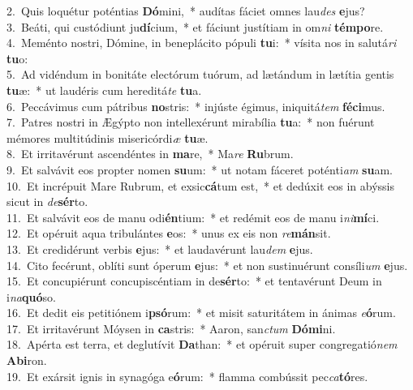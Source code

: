 {2.~}Quis loquétur poténtias \textbf{Dó}mini,~* audítas fáciet omnes lau\textit{des} \textbf{e}jus?\\
{3.~}Beáti, qui custódiunt ju\textbf{dí}cium,~* et fáciunt justítiam in om\textit{ni} \textbf{tém}\textbf{po}re.\\
{4.~}Meménto nostri, Dómine, in beneplácito pópuli \textbf{tu}i:~* vísita nos in salutá\textit{ri} \textbf{tu}o:\\
{5.~}Ad vidéndum in bonitáte electórum tuórum, ad lætándum in lætítia gentis \textbf{tu}æ:~* ut laudéris cum hereditá\textit{te} \textbf{tu}a.\\
{6.~}Peccávimus cum pátribus \textbf{no}stris:~* injúste égimus, iniquitá\textit{tem} \textbf{fé}\textbf{ci}mus.\\
{7.~}Patres nostri in Ægýpto non intellexérunt mirabília \textbf{tu}a:~* non fuérunt mémores multitúdinis misericórdi\textit{æ} \textbf{tu}æ.\\
{8.~}Et irritavérunt ascendéntes in \textbf{ma}re,~* Ma\textit{re} \textbf{Ru}brum.\\
{9.~}Et salvávit eos propter nomen \textbf{su}um:~* ut notam fáceret poténti\textit{am} \textbf{su}am.\\
{10.~}Et incrépuit Mare Rubrum, et exsic\textbf{cá}tum est,~* et dedúxit eos in abýssis sicut in \textit{de}\textbf{sér}to.\\
{11.~}Et salvávit eos de manu odi\textbf{én}tium:~* et redémit eos de manu i\textit{ni}\textbf{mí}ci.\\
{12.~}Et opéruit aqua tribulántes \textbf{e}os:~* unus ex eis non \textit{re}\textbf{mán}sit.\\
{13.~}Et credidérunt verbis \textbf{e}jus:~* et laudavérunt lau\textit{dem} \textbf{e}jus.\\
{14.~}Cito fecérunt, oblíti sunt óperum \textbf{e}jus:~* et non sustinuérunt consíli\textit{um} \textbf{e}jus.\\
{15.~}Et concupiérunt concupiscéntiam in de\textbf{sér}to:~* et tentavérunt Deum in i\textit{na}\textbf{quó}so.\\
{16.~}Et dedit eis petitiónem i\textbf{psó}rum:~* et misit saturitátem in ánimas \textit{e}\textbf{ó}rum.\\
{17.~}Et irritavérunt Móysen in \textbf{ca}stris:~* Aaron, san\textit{ctum} \textbf{Dó}\textbf{mi}ni.\\
{18.~}Apérta est terra, et deglutívit \textbf{Da}than:~* et opéruit super congregatió\textit{nem} \textbf{A}\textbf{bi}ron.\\
{19.~}Et exársit ignis in synagóga e\textbf{ó}rum:~* flamma combússit pec\textit{ca}\textbf{tó}res.\\
